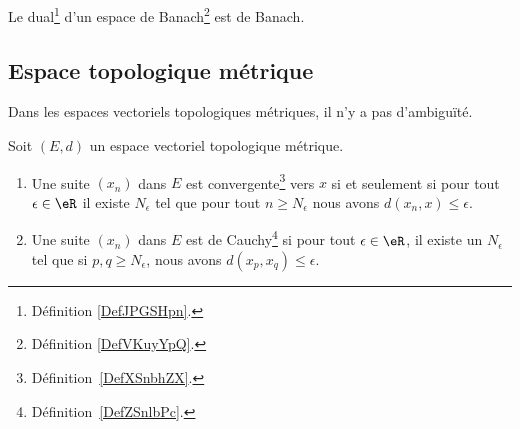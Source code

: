 \begin{proposition}     \label{PROPooOVGGooNffWJW}
    Le dual\footnote{Définition \ref{DefJPGSHpn}.} d'un espace de Banach\footnote{Définition \ref{DefVKuyYpQ}.} est de Banach.
\end{proposition}

\subsection{Espace topologique métrique}

Dans les espaces vectoriels topologiques métriques, il n'y a pas d'ambiguïté.
\begin{proposition}     \label{PropooUEEOooLeIImr}
	Soit \( (E,d)\) un espace vectoriel topologique métrique.
	\begin{enumerate}
		\item   \label{ItemooROYMooAQCXnj}
		      Une suite \( (x_n)\) dans \( E\) est convergente\footnote{Définition~\ref{DefXSnbhZX}.} vers \( x\) si et seulement si pour tout \( \epsilon\in \eR\) il existe \( N_{\epsilon}\) tel que pour tout \( n\geq N_{\epsilon}\) nous avons \( d(x_n,x)\leq \epsilon\).
		\item
		      Une suite \( (x_n)\) dans \( E\) est de Cauchy\footnote{Définition~\ref{DefZSnlbPc}.} si pour tout \( \epsilon\in \eR\), il existe un \( N_{\epsilon}\) tel que si \( p,q\geq N_{\epsilon}\), nous avons \( d(x_p,x_q)\leq \epsilon\).
	\end{enumerate}
\end{proposition}


